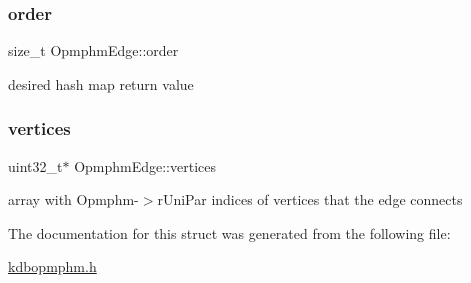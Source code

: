 \subsubsection{\texorpdfstring{order}{order}}
{\footnotesize\ttfamily size\+\_\+t Opmphm\+Edge\+::order}

desired hash map return value \mbox{\label{structOpmphmEdge_ae8d5721fe78750b17b5d4a9b8e3fc2b2}} 
\subsubsection{\texorpdfstring{vertices}{vertices}}
{\footnotesize\ttfamily uint32\+\_\+t$\ast$ Opmphm\+Edge\+::vertices}

array with Opmphm-\/$>$r\+Uni\+Par indices of vertices that the edge connects 

The documentation for this struct was generated from the following file\+:\begin{DoxyCompactItemize}
\item 
\hyperlink{kdbopmphm_8h}{kdbopmphm.\+h}\end{DoxyCompactItemize}
